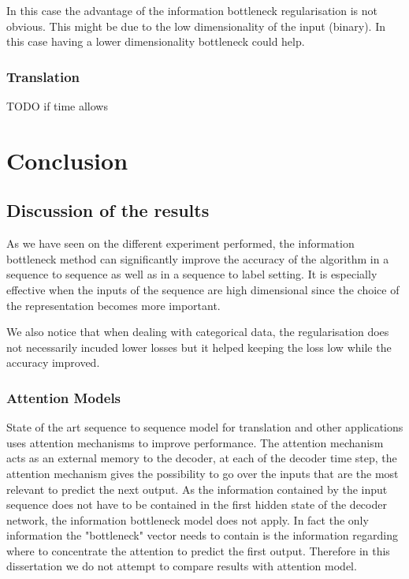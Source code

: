 \documentclass[11pt,oneside,openright]{report}
\begin{document}
In this case the advantage of the information bottleneck regularisation is not obvious. This might be due to the low dimensionality of the input (binary). In this case having a lower dimensionality bottleneck could help.

\subsection{Translation}
TODO if time allows

\chapter{Conclusion}
\section{Discussion of the results}
As we have seen on the different experiment performed, the information bottleneck method can significantly improve the accuracy of the algorithm in a sequence to sequence as well as in a sequence to label setting. It is especially effective when the inputs of the sequence are high dimensional since the choice of the representation becomes more important. 

We also notice that when dealing with categorical data, the regularisation does not necessarily incuded lower losses but it helped keeping the loss low while the accuracy improved.

\subsection{Attention Models}
State of the art sequence to sequence model for translation and other applications uses attention mechanisms to improve performance. The attention mechanism acts as an external memory to the decoder, at each of the decoder time step, the attention mechanism gives the possibility to go over the inputs that are the most relevant to predict the next output. As the information contained by the input sequence does not have to be contained in the first hidden state of the decoder network, the information bottleneck model does not apply. In fact the only information the "bottleneck" vector needs to contain is the information regarding where to concentrate the attention to predict the first output. Therefore in this dissertation we do not attempt to compare results with attention model.
\end{document}
